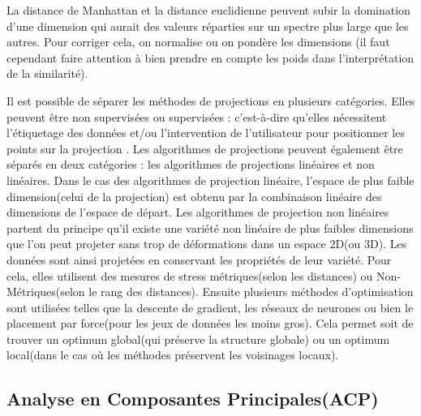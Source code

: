 \smallskip
La distance de Manhattan et la distance euclidienne peuvent subir la domination d’une dimension qui aurait des valeurs réparties sur un spectre plus large que les autres\cite{HeulotThese}. Pour corriger cela, on normalise ou on pondère les dimensions (il faut cependant faire attention à bien prendre en compte les poids dans l’interprétation de la similarité).

\medskip
Il est possible de séparer les méthodes de projections en plusieurs catégories.
Elles peuvent être non supervisées ou supervisées : c’est-à-dire qu’elles nécessitent l’étiquetage des données et/ou l’intervention de l’utilisateur pour positionner les points sur la projection\cite{karimi2018Supervised} \cite{HeulotThese}. 
Les algorithmes de projections peuvent également être séparés en deux catégories : les algorithmes de projections linéaires et non linéaires.
Dans le cas des algorithmes de projection linéaire, l’espace de plus faible dimension(celui de la projection) est obtenu par la combinaison linéaire des dimensions de l’espace de départ.
\smallskip
\newline
Les algorithmes de projection non linéaires partent du principe qu'il existe une variété non linéaire de plus faibles dimensions que l’on peut projeter sans trop de déformations dans un espace 2D(ou 3D). Les données sont ainsi projetées en conservant les propriétés de leur variété. Pour cela, elles utilisent des mesures de stress métriques(selon les distances) ou Non-Métriques(selon le rang des distances). 
Ensuite plusieurs méthodes d’optimisation sont utilisées telles que la descente de gradient, les réseaux de neurones\cite{hwang1991GradientNeuralNetwork} ou bien le placement par force(pour les jeux de données les moins gros)\cite{dickhaus2014ForceBrute}. 
Cela permet soit de trouver un optimum global(qui préserve la structure globale) ou un optimum local(dans le cas où les méthodes préservent les voisinages locaux).
\smallskip



\subsection{Analyse en Composantes Principales(ACP)}

